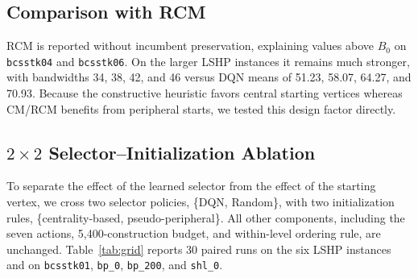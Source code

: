 \documentclass[runningheads]{llncs}
\begin{document}
\subsection{Comparison with RCM}

RCM is reported without incumbent preservation, explaining values above $B_0$ on \texttt{bcsstk04} and \texttt{bcsstk06}. On the larger LSHP instances it remains much stronger, with bandwidths 34, 38, 42, and 46 versus DQN means of 51.23, 58.07, 64.27, and 70.93. Because the constructive heuristic favors central starting vertices whereas CM/RCM benefits from peripheral starts, we tested this design factor directly.

\subsection{$2\times2$ Selector--Initialization Ablation}
\label{sec:peripheral}

To separate the effect of the learned selector from the effect of the starting vertex, we cross two selector policies, \{DQN, Random\}, with two initialization rules, \{centrality-based, pseudo-peripheral\}. All other components, including the seven actions, 5,400-construction budget, and within-level ordering rule, are unchanged. Table~\ref{tab:grid} reports 30 paired runs on the six LSHP instances and on \texttt{bcsstk01}, \texttt{bp\_0}, \texttt{bp\_200}, and \texttt{shl\_0}.
\end{document}
